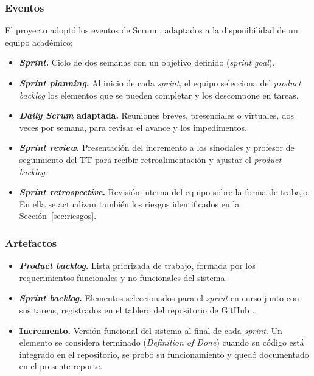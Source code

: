 \subsubsection{Eventos}

El proyecto adoptó los eventos de Scrum \cite{schwaber2020scrum}, adaptados a la
disponibilidad de un equipo académico:

\begin{itemize}
    \item \textbf{\textit{Sprint}.} Ciclo de dos semanas con un objetivo definido
    (\textit{sprint goal}).

    \item \textbf{\textit{Sprint planning}.} Al inicio de cada \textit{sprint}, el equipo
    selecciona del \textit{product backlog} los elementos que se pueden completar y los
    descompone en tareas.

    \item \textbf{\textit{Daily Scrum} adaptada.} Reuniones breves, presenciales o
    virtuales, dos veces por semana, para revisar el avance y los impedimentos.

    \item \textbf{\textit{Sprint review}.} Presentación del incremento a los sinodales y profesor de seguimiento del
    TT para recibir retroalimentación y ajustar el \textit{product backlog}.

    \item \textbf{\textit{Sprint retrospective}.} Revisión interna del equipo sobre la
    forma de trabajo. En ella se actualizan también los riesgos identificados en la
    Sección~\ref{sec:riesgos}.
\end{itemize}

\subsubsection{Artefactos}

\begin{itemize}
    \item \textbf{\textit{Product backlog}.} Lista priorizada de trabajo, formada por los
    requerimientos funcionales y no funcionales del sistema.

    \item \textbf{\textit{Sprint backlog}.} Elementos seleccionados para el
    \textit{sprint} en curso junto con sus tareas, registrados en el tablero del
    repositorio de GitHub \cite{githubDocs}.

    \item \textbf{Incremento.} Versión funcional del sistema al final de cada
    \textit{sprint}. Un elemento se considera terminado (\textit{Definition of Done})
    cuando su código está integrado en el repositorio, se probó su funcionamiento y quedó
    documentado en el presente reporte.
\end{itemize}

